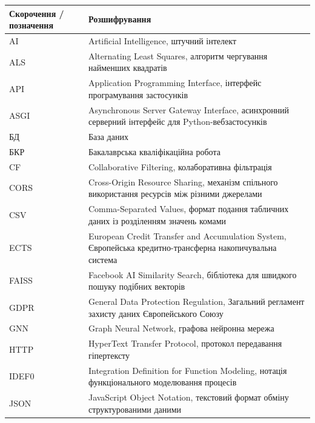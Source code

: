 \documentclass[
]{article}
\newcounter{none} %
\begin{document}
{\def\LTcaptype{none} %
\begin{longtable}[]{@{}
  >{\raggedright\arraybackslash}p{}
  >{\raggedright\arraybackslash}p{}@{}}
\toprule\noalign{}
\begin{minipage}[b]{\linewidth}\centering
\textbf{Скорочення / позначення}
\end{minipage} & \begin{minipage}[b]{\linewidth}\centering
\textbf{Розшифрування}
\end{minipage} \\
\midrule\noalign{}
\endhead
\bottomrule\noalign{}
\endlastfoot
AI & Artificial Intelligence, штучний інтелект \\
ALS & Alternating Least Squares, алгоритм чергування найменших
квадратів \\
API & Application Programming Interface, інтерфейс програмування
застосунків \\
ASGI & Asynchronous Server Gateway Interface, асинхронний серверний
інтерфейс для Python-вебзастосунків \\
БД & База даних \\
БКР & Бакалаврська кваліфікаційна робота \\
CF & Collaborative Filtering, колаборативна фільтрація \\
CORS & Cross-Origin Resource Sharing, механізм спільного використання
ресурсів між різними джерелами \\
CSV & Comma-Separated Values, формат подання табличних даних із
розділенням значень комами \\
ECTS & European Credit Transfer and Accumulation System, Європейська
кредитно-трансферна накопичувальна система \\
FAISS & Facebook AI Similarity Search, бібліотека для швидкого пошуку
подібних векторів \\
GDPR & General Data Protection Regulation, Загальний регламент захисту
даних Європейського Союзу \\
GNN & Graph Neural Network, графова нейронна мережа \\
HTTP & HyperText Transfer Protocol, протокол передавання гіпертексту \\
IDEF0 & Integration Definition for Function Modeling, нотація
функціонального моделювання процесів \\
JSON & JavaScript Object Notation, текстовий формат обміну
структурованими даними \\

\end{longtable}}
\end{document}
